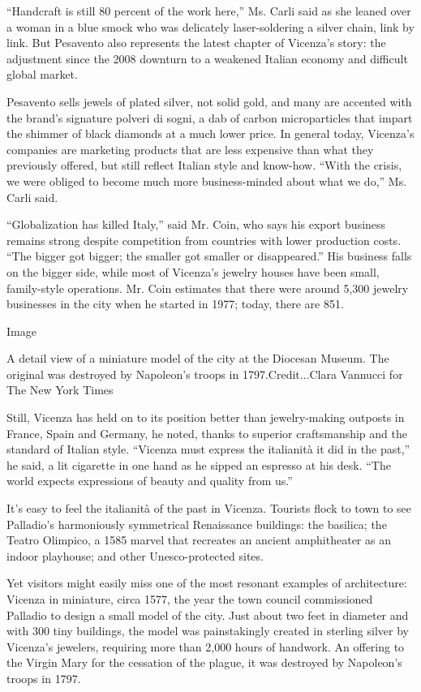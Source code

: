 ``Handcraft is still 80 percent of the work here,'' Ms. Carli said as
she leaned over a woman in a blue smock who was delicately
laser-soldering a silver chain, link by link. But Pesavento also
represents the latest chapter of Vicenza's story: the adjustment since
the 2008 downturn to a weakened Italian economy and difficult global
market.

Pesavento sells jewels of plated silver, not solid gold, and many are
accented with the brand's signature polveri di sogni, a dab of carbon
microparticles that impart the shimmer of black diamonds at a much lower
price. In general today, Vicenza's companies are marketing products that
are less expensive than what they previously offered, but still reflect
Italian style and know-how. ``With the crisis, we were obliged to become
much more business-minded about what we do,'' Ms. Carli said.

``Globalization has killed Italy,'' said Mr. Coin, who says his export
business remains strong despite competition from countries with lower
production costs. ``The bigger got bigger; the smaller got smaller or
disappeared.'' His business falls on the bigger side, while most of
Vicenza's jewelry houses have been small, family-style operations. Mr.
Coin estimates that there were around 5,300 jewelry businesses in the
city when he started in 1977; today, there are 851.

Image

A detail view of a miniature model of the city at the Diocesan Museum.
The original was destroyed by Napoleon's troops in 1797.Credit...Clara
Vannucci for The New York Times

Still, Vicenza has held on to its position better than jewelry-making
outposts in France, Spain and Germany, he noted, thanks to superior
craftsmanship and the standard of Italian style. ``Vicenza must express
the italianità it did in the past,'' he said, a lit cigarette in one
hand as he sipped an espresso at his desk. ``The world expects
expressions of beauty and quality from us.''

It's easy to feel the italianità of the past in Vicenza. Tourists flock
to town to see Palladio's harmoniously symmetrical Renaissance
buildings: the basilica; the Teatro Olimpico, a 1585 marvel that
recreates an ancient amphitheater as an indoor playhouse; and other
Unesco-protected sites.

Yet visitors might easily miss one of the most resonant examples of
architecture: Vicenza in miniature, circa 1577, the year the town
council commissioned Palladio to design a small model of the city. Just
about two feet in diameter and with 300 tiny buildings, the model was
painstakingly created in sterling silver by Vicenza's jewelers,
requiring more than 2,000 hours of handwork. An offering to the Virgin
Mary for the cessation of the plague, it was destroyed by Napoleon's
troops in 1797.

